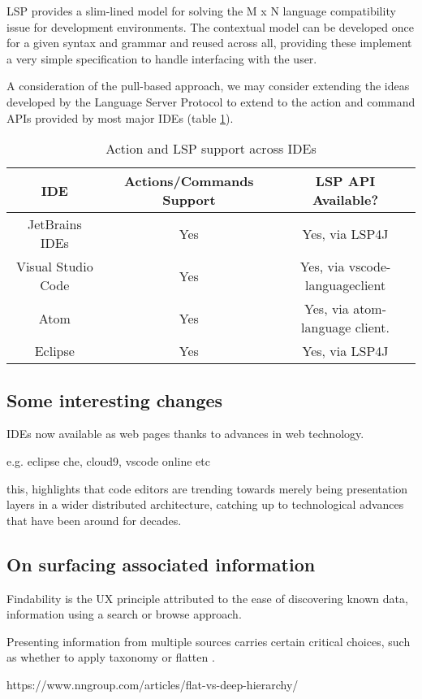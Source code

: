 LSP provides a slim-lined model for solving the M x N language compatibility issue for development environments. The contextual model can be developed once for a given syntax and grammar and reused across all, providing these implement a very simple specification to handle interfacing with the user.

A consideration of the pull-based approach, we may consider extending the ideas developed by the Language Server Protocol to extend to the action and command APIs provided by most major IDEs (table \ref{table:1}).

\begin{table}[h!]
	\centering
	\begin{tabular}{ | c | c | c |}
		\hline
		IDE & Actions/Commands Support & LSP API Available?\\
		\hline
		\hline
		JetBrains IDEs & Yes & Yes, via LSP4J\\ 
		Visual Studio Code & Yes & Yes, via vscode-languageclient \\
		Atom & Yes & Yes, via atom-language client.\\
		Eclipse & Yes & Yes, via LSP4J\\
		\hline
	\end{tabular}
	\caption{Action and LSP support across IDEs}
	\label{table:1}
\end{table}

\subsection{Some interesting changes}

IDEs now available as web pages thanks to advances in web technology.

e.g. eclipse che, cloud9, vscode online etc

this, highlights that code editors are trending towards merely being presentation layers in a wider distributed architecture, catching up to technological advances that have been around for decades.

\subsection{On surfacing associated information}

Findability is the UX principle attributed to the ease of discovering known data, information using a search or browse approach.

Presenting information from multiple sources carries certain critical choices, such as whether to apply taxonomy or flatten . 

https://www.nngroup.com/articles/flat-vs-deep-hierarchy/